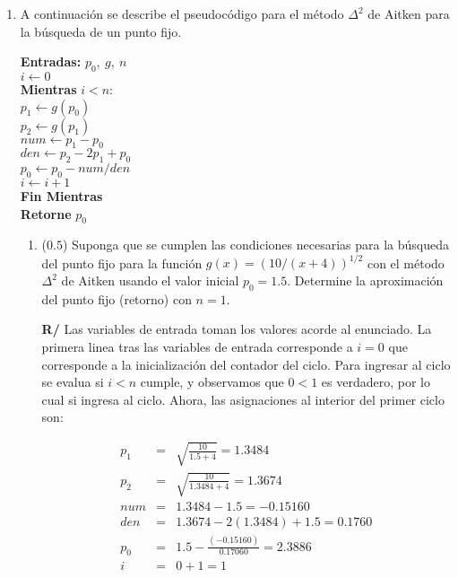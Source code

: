 \documentclass[12pt]{article}
\begin{document}
\vspace{-.5cm}
  \begin{enumerate}[leftmargin=*,widest=9]

    \item A continuación se describe el pseudocódigo para el método \(\Delta^2\) de Aitken para la búsqueda de un punto fijo.

    \small{
    \textbf{Entradas:} \(p_0, \ g, \ n\)\\
    \(i \gets 0\)\\
    \textbf{Mientras} \(i < n\):\\
    \hspace*{.5 cm} \(p_1 \gets g(p_0)\)\\
    \hspace*{.5 cm} \(p_2 \gets g(p_1)\)\\
    \hspace*{.5 cm} \(num \gets p_{1} - p_0\)\\
    \hspace*{.5 cm} \(den \gets p_{2} - 2p_{1} + p_0\)\\
    \hspace*{.5 cm} \(p_0 \gets p_0 - num / den \)\\
    \hspace*{.5 cm} \(i \gets i + 1\)\\
    \textbf{Fin Mientras}\\
    \textbf{Retorne} \(p_0\)
    }

    \begin{enumerate}[label=\alph*]
    \item (\(0.5\)) Suponga que se cumplen las condiciones necesarias para la búsqueda del punto fijo para la función \(g(x) = (10/(x+4))^{1/2}\)
    con el método \(\Delta^2\) de Aitken usando el valor inicial \(p_0=1.5\). Determine la aproximación del punto fijo (retorno) con \(n=1\).

\textbf{R/} Las variables de entrada toman los valores acorde al enunciado. La primera linea tras las variables de entrada corresponde a \(i=0\) que corresponde a la inicialización del contador del ciclo. Para ingresar al ciclo se evalua si \(i<n\) cumple, y observamos que \(0 < 1\) es verdadero, por lo cual si ingresa al ciclo. Ahora, las asignaciones al interior del primer ciclo son:

\begin{eqnarray*}
p_1 &=& \sqrt{\frac{10}{1.5 + 4}} = 1.3484 \\
p_2 &=& \sqrt{\frac{10}{1.3484 + 4}} = 1.3674 \\
num &=& 1.3484 - 1.5 = -0.15160\\
den &=& 1.3674 - 2(1.3484) + 1.5 = 0.1760\\
p_0 &=& 1.5 - \frac{(-0.15160)}{0.17060} = 2.3886\\
i &=& 0 + 1 = 1
\end{eqnarray*}


\end{enumerate}
\end{enumerate}
\end{document}
